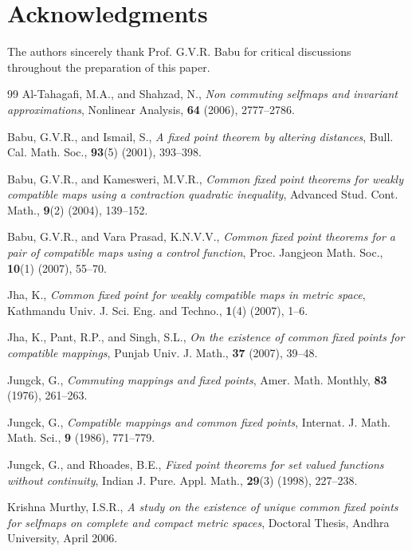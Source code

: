\documentclass[a4paper,12pt,oneside]{article}
\numberwithin{equation}{section}
\begin{document}
\section*{Acknowledgments}
The authors sincerely thank Prof. G.V.R. Babu for critical discussions throughout the preparation of this paper.

\begin{thebibliography}{99}
Al-Tahagafi, M.A., and Shahzad, N., \textit{Non commuting selfmaps and invariant approximations}, Nonlinear Analysis, \textbf{64} (2006), 2777–2786.

Babu, G.V.R., and Ismail, S., \textit{A fixed point theorem by altering distances}, Bull. Cal. Math. Soc., \textbf{93}(5) (2001), 393–398.

Babu, G.V.R., and Kamesweri, M.V.R., \textit{Common fixed point theorems for weakly compatible maps using a contraction quadratic inequality}, Advanced Stud. Cont. Math., \textbf{9}(2) (2004), 139–152.

Babu, G.V.R., and Vara Prasad, K.N.V.V., \textit{Common fixed point theorems for a pair of compatible maps using a control function}, Proc. Jangjeon Math. Soc., \textbf{10}(1) (2007), 55–70.

Jha, K., \textit{Common fixed point for weakly compatible maps in metric space}, Kathmandu Univ. J. Sci. Eng. and Techno., \textbf{1}(4) (2007), 1–6.

Jha, K., Pant, R.P., and Singh, S.L., \textit{On the existence of common fixed points for compatible mappings}, Punjab Univ. J. Math., \textbf{37} (2007), 39–48.

Jungck, G., \textit{Commuting mappings and fixed points}, Amer. Math. Monthly, \textbf{83} (1976), 261–263.

Jungck, G., \textit{Compatible mappings and common fixed points}, Internat. J. Math. Math. Sci., \textbf{9} (1986), 771–779.

Jungck, G., and Rhoades, B.E., \textit{Fixed point theorems for set valued functions without continuity}, Indian J. Pure. Appl. Math., \textbf{29}(3) (1998), 227–238.

Krishna Murthy, I.S.R., \textit{A study on the existence of unique common fixed points for selfmaps on complete and compact metric spaces}, Doctoral Thesis, Andhra University, April 2006.


\end{thebibliography}
\end{document}
